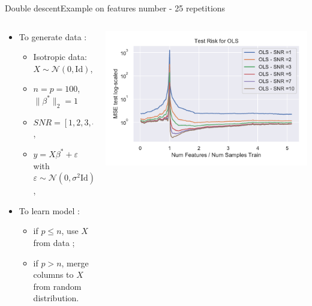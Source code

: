 \documentclass[10pt,aspectratio=43]{beamer}
\begin{document}
\begin{frame}{Double descent}{Example on features number - 25 repetitions}
    \begin{columns}
        \begin{column}{0.46\textwidth}
            \begin{itemize}
                \item To generate data :
                \begin{itemize}
                    \item Isotropic data: $X\sim\mathcal{N}(0,\mathrm{Id})$,
                    \item $n=p=100$,\\
                    $\|\beta^*\|_2=1$
                    \item $SNR = [1, 2, 3, 5, 7, 10]$, \\
                    \item $y = X\beta^*+\varepsilon$ with $\varepsilon\sim \mathcal{N}(0, \sigma^2\mathrm{Id})$,
                \end{itemize}
                \item To learn model :
                \begin{itemize}
                    \item if $p\leq n$, use $X$ from data ;
                    \item if $p > n$, merge columns to $X$ from random distribution.
                \end{itemize}
            \end{itemize}
        \end{column}
        \begin{column}{0.7\textwidth}
            \begin{center}
             \includegraphics[width=1\textwidth]{ols_fail_log_snr_features.pdf}

\end{center}
\end{column}
\end{columns}
\end{frame}
\end{document}
